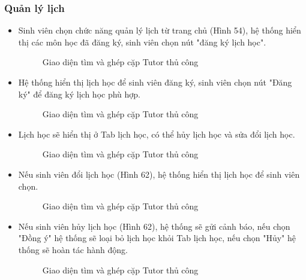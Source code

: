 \subsubsection*{Quản lý lịch}
\begin{itemize}
    \item Sinh viên chọn chức năng quản lý lịch từ trang chủ (Hình 54), hệ thống hiển thị các môn học đã đăng ký, sinh viên chọn nút "đăng ký lịch học". 
    \begin{figure}[H]
    \centering
    \setlength{\fboxsep}{2pt}     
    \setlength{\fboxrule}{0.5pt}   
    \caption{Giao diện tìm và ghép cặp Tutor thủ công}
    \end{figure}
    \item Hệ thống hiển thị lịch học để sinh viên đăng ký, sinh viên chọn nút "Đăng ký" để đăng ký lịch học phù hợp.
    \begin{figure}[H]
    \centering
    \setlength{\fboxsep}{2pt}     
    \setlength{\fboxrule}{0.5pt}   
    \caption{Giao diện tìm và ghép cặp Tutor thủ công}
    \end{figure}
    \item Lịch học sẽ hiển thị ở Tab lịch học, có thể hủy lịch học và sửa đổi lịch học.
    \begin{figure}[H]
    \centering
    \setlength{\fboxsep}{2pt}     
    \setlength{\fboxrule}{0.5pt}   
    \caption{Giao diện tìm và ghép cặp Tutor thủ công}
    \end{figure}
    \item Nếu sinh viên đổi lịch học (Hình 62), hệ thống hiển thị lịch học để sinh viên chọn.
    \begin{figure}[H]
    \centering
    \setlength{\fboxsep}{2pt}     
    \setlength{\fboxrule}{0.5pt}   
    \caption{Giao diện tìm và ghép cặp Tutor thủ công}
    \end{figure}
    \item Nếu sinh viên hủy lịch học (Hình 62), hệ thống sẽ gửi cảnh báo, nếu chọn "Đồng ý" hệ thống sẽ loại bỏ lịch học khỏi Tab lịch học, nếu chọn "Hủy" hệ thống sẽ hoàn tác hành động.
    \begin{figure}[H]
    \centering
    \setlength{\fboxsep}{2pt}     
    \setlength{\fboxrule}{0.5pt}   
    \caption{Giao diện tìm và ghép cặp Tutor thủ công}
    \end{figure}
\end{itemize}
